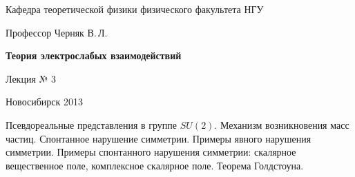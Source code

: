 \documentclass[12pt,pagesize,paper=192mm:108mm]{scrbook}
\begin{document}
\begin{titlepage}
\begin{center}
    Кафедра теоретической физики физического факультета НГУ
    \medskip

    \Large
    Профессор Черняк В.\,Л.
    \bigskip

    \huge
    \textbf{Теория электрослабых взаимодействий}
    \bigskip

    \Large
    Лекция № 3
    \vfill

    \vfill

    \normalsize    Новосибирск 2013
    \smallskip
    
    \ccbysa
  \end{center}
\end{titlepage}
\newpage

\vspace*{-1em}
\begin{center}
  \vfill
  \begin{minipage}{0.66\linewidth}
    Псевдореальные представления в группе $SU(2)$. Механизм
    возникновения масс частиц.  Спонтанное нарушение
    симметрии. Примеры явного нарушения симметрии.  Примеры
    спонтанного нарушения симметрии: скалярное вещественное поле,
    комплексное скалярное поле. Теорема Голдстоуна.
  \end{minipage}
  \vfill
\end{center}
\end{document}
